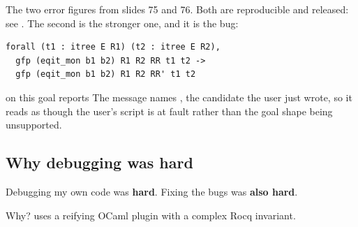 \begin{gapbox}
The two error figures from slides 75 and 76. Both are reproducible and
released: see . The second is the stronger
one, and it is the bug:
\begin{lstlisting}
forall (t1 : itree E R1) (t2 : itree E R2),
  gfp (eqit_mon b1 b2) R1 R2 RR t1 t2 ->
  gfp (eqit_mon b1 b2) R1 R2 RR' t1 t2
\end{lstlisting}
 on this goal reports
 The message names ,
the candidate the user just wrote, so it reads as though the user's script is at
fault rather than the goal shape being unsupported.
\end{gapbox}

\subsection{Why debugging was hard}

Debugging my own code was \textbf{hard}. Fixing the bugs was \textbf{also hard}.

Why?  uses a reifying OCaml plugin with a complex Rocq
invariant.

